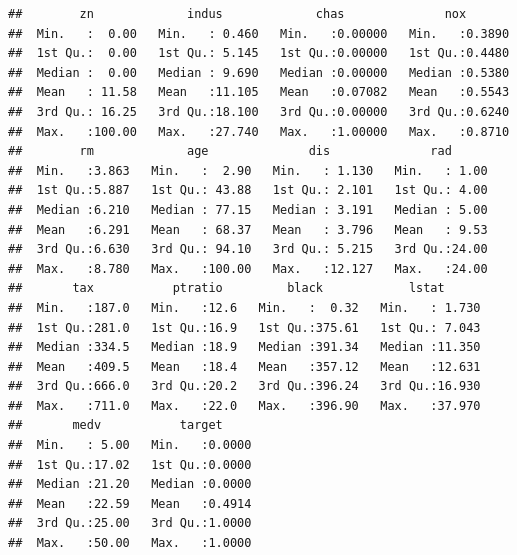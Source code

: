 \documentclass[]{article}
\begin{document}
\begin{verbatim}
##        zn             indus             chas              nox        
##  Min.   :  0.00   Min.   : 0.460   Min.   :0.00000   Min.   :0.3890  
##  1st Qu.:  0.00   1st Qu.: 5.145   1st Qu.:0.00000   1st Qu.:0.4480  
##  Median :  0.00   Median : 9.690   Median :0.00000   Median :0.5380  
##  Mean   : 11.58   Mean   :11.105   Mean   :0.07082   Mean   :0.5543  
##  3rd Qu.: 16.25   3rd Qu.:18.100   3rd Qu.:0.00000   3rd Qu.:0.6240  
##  Max.   :100.00   Max.   :27.740   Max.   :1.00000   Max.   :0.8710  
##        rm             age              dis              rad       
##  Min.   :3.863   Min.   :  2.90   Min.   : 1.130   Min.   : 1.00  
##  1st Qu.:5.887   1st Qu.: 43.88   1st Qu.: 2.101   1st Qu.: 4.00  
##  Median :6.210   Median : 77.15   Median : 3.191   Median : 5.00  
##  Mean   :6.291   Mean   : 68.37   Mean   : 3.796   Mean   : 9.53  
##  3rd Qu.:6.630   3rd Qu.: 94.10   3rd Qu.: 5.215   3rd Qu.:24.00  
##  Max.   :8.780   Max.   :100.00   Max.   :12.127   Max.   :24.00  
##       tax           ptratio         black            lstat       
##  Min.   :187.0   Min.   :12.6   Min.   :  0.32   Min.   : 1.730  
##  1st Qu.:281.0   1st Qu.:16.9   1st Qu.:375.61   1st Qu.: 7.043  
##  Median :334.5   Median :18.9   Median :391.34   Median :11.350  
##  Mean   :409.5   Mean   :18.4   Mean   :357.12   Mean   :12.631  
##  3rd Qu.:666.0   3rd Qu.:20.2   3rd Qu.:396.24   3rd Qu.:16.930  
##  Max.   :711.0   Max.   :22.0   Max.   :396.90   Max.   :37.970  
##       medv           target      
##  Min.   : 5.00   Min.   :0.0000  
##  1st Qu.:17.02   1st Qu.:0.0000  
##  Median :21.20   Median :0.0000  
##  Mean   :22.59   Mean   :0.4914  
##  3rd Qu.:25.00   3rd Qu.:1.0000  
##  Max.   :50.00   Max.   :1.0000
\end{verbatim}
\end{document}
